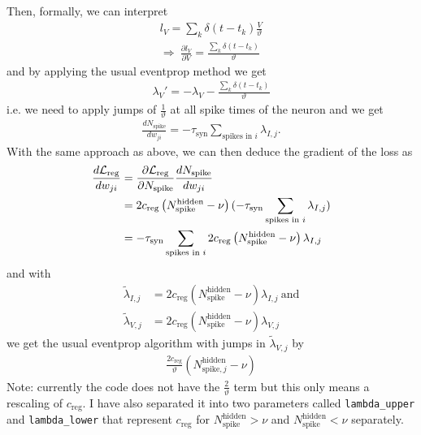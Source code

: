 \documentclass[a4paper]{article}
\begin{document}
  Then, formally, we can interpret
  \begin{align}
    l_V= \sum_k \delta(t-t_{k})
    \frac{V}{\vartheta} \\
    \Rightarrow \ \frac{\partial l_V}{\partial V} = \frac{\sum_k \delta(t-t_{k})}{\vartheta}
  \end{align}
  and by applying the usual eventprop method we get
  \begin{align}
    \lambda_V' = -\lambda_V - \frac{\sum_k \delta(t-t_{k})}{\vartheta}
  \end{align}
  i.e. we need to apply jumps of $\frac{1}{\vartheta}$ at all spike
  times of the neuron and we get
  \begin{align}
    \frac{d N_{\text{spike}}}{d w_{ji}} = -\tau_{\text{syn}}
    \sum_{\text{spikes in } i} \lambda_{I,j}.
  \end{align}
  With the same approach as above, we can then deduce the gradient of
  the loss as
  \begin{align}
    \frac{d {\cal L}_{\text{reg}}}{d w_{ji}} &= \frac{\partial {\cal
        L}_{\text{reg}}}{\partial N_{\text{spike}}}\frac{d N_{\text{spike}}}{d w_{ji}} \\
    &= 2 c_{\text{reg}} \left(N_{\text{spike}}^{\text{hidden}} -
    \nu\right) (-\tau_{\text{syn}}
    \sum_{\text{spikes in } i} \lambda_{I,j}) \\
    &= -\tau_{\text{syn}}
    \sum_{\text{spikes in } i} 2 c_{\text{reg}} \left(N_{\text{spike}}^{\text{hidden}} -
    \nu\right) \lambda_{I,j}
  \end{align}
  and with
  \begin{align}
    \tilde{\lambda}_{I,j} &= 2 c_{\text{reg}} \left(N_{\text{spike}}^{\text{hidden}} -
    \nu\right) \lambda_{I,j} \ \text{and} \\
    \tilde{\lambda}_{V,j} &= 2 c_{\text{reg}} \left(N_{\text{spike}}^{\text{hidden}} -
    \nu\right) \lambda_{V,j} 
  \end{align}
  we get the usual eventprop algorithm with jumps in
  $\tilde{\lambda}_{V,j}$ by
  \begin{align}
    \frac{2 c_{\text{reg}}}{\vartheta} \left(N_{\text{spike},j}^{\text{hidden}} -
    \nu\right)
  \end{align}
  Note: currently the code does not have the $\frac{2}{\vartheta}$
  term but this only means a rescaling of $c_{\text{reg}}$. I have
  also separated it into two parameters called \verb+lambda_upper+ and
  \verb+lambda_lower+ that represent $c_{\text{reg}}$ for
  $N_{\text{spike}}^{\text{hidden}} > \nu$ and $N_{\text{spike}}^{\text{hidden}} < \nu$ separately.
  
\end{document}
